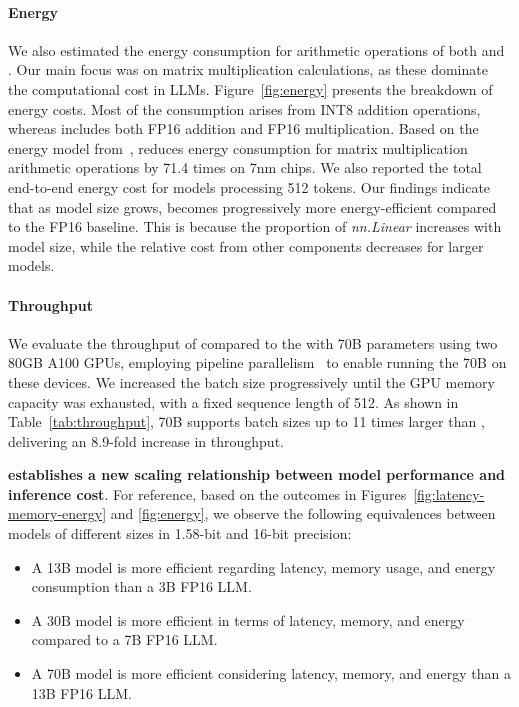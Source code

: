 \paragraph{Energy}

We also estimated the energy consumption for arithmetic operations of both  and . Our main focus was on matrix multiplication calculations, as these dominate the computational cost in LLMs. Figure~\ref{fig:energy} presents the breakdown of energy costs. Most of the  consumption arises from INT8 addition operations, whereas  includes both FP16 addition and FP16 multiplication. Based on the energy model from~\cite{energycost, pokebnn},  reduces energy consumption for matrix multiplication arithmetic operations by 71.4 times on 7nm chips. We also reported the total end-to-end energy cost for models processing 512 tokens. Our findings indicate that as model size grows,  becomes progressively more energy-efficient compared to the FP16  baseline. This is because the proportion of \emph{nn.Linear} increases with model size, while the relative cost from other components decreases for larger models.

\paragraph{Throughput}

We evaluate the throughput of  compared to the  with 70B parameters using two 80GB A100 GPUs, employing pipeline parallelism~\cite{gpipe} to enable running the  70B on these devices. We increased the batch size progressively until the GPU memory capacity was exhausted, with a fixed sequence length of 512. As shown in Table~\ref{tab:throughput},  70B supports batch sizes up to 11 times larger than , delivering an 8.9-fold increase in throughput.

\textbf{ establishes a new scaling relationship between model performance and inference cost}. For reference, based on the outcomes in Figures~\ref{fig:latency-memory-energy} and \ref{fig:energy}, we observe the following equivalences between models of different sizes in 1.58-bit and 16-bit precision:

\begin{itemize}
    \item A 13B  model is more efficient regarding latency, memory usage, and energy consumption than a 3B FP16 LLM.
    \item A 30B  model is more efficient in terms of latency, memory, and energy compared to a 7B FP16 LLM.
    \item A 70B  model is more efficient considering latency, memory, and energy than a 13B FP16 LLM.
\end{itemize}

